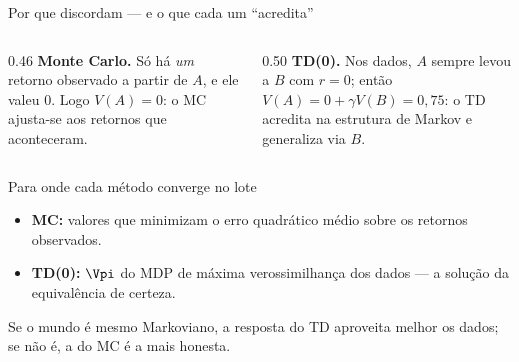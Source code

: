 \documentclass[aspectratio=169, 11pt]{beamer}
\begin{document}
\begin{frame}{Por que discordam — e o que cada um ``acredita''}
  \begin{columns}[T]
    \begin{column}{0.46\textwidth}
      \small\textbf{Monte Carlo.} Só há \emph{um} retorno observado a
      partir de $A$, e ele valeu $0$. Logo $V(A) = 0$: o MC ajusta-se
      aos \alert{retornos que aconteceram}.
    \end{column}
    \begin{column}{0.50\textwidth}
      \small\textbf{TD(0).} Nos dados, $A$ sempre levou a $B$ com $r=0$;
      então $V(A) = 0 + \gamma V(B) = 0{,}75$: o TD \alert{acredita na
      estrutura de Markov} e generaliza via $B$.
    \end{column}
  \end{columns}

  \smallskip
  \begin{teobox}[fontupper=\small]{Para onde cada método converge no lote}
    \vspace{-0.2em}
    \begin{itemize}\setlength{\itemsep}{0.1ex}
      \item \textbf{MC:} valores que minimizam o erro quadrático médio
        sobre os retornos observados.
      \item \textbf{TD(0):} $\Vpi$ do MDP de máxima verossimilhança dos
        dados — a solução da \alert{equivalência de certeza}.
    \end{itemize}
  \end{teobox}

  \begin{ideiabox}
    Se o mundo é mesmo Markoviano, a resposta do TD aproveita melhor os
    dados; se não é, a do MC é a mais honesta.
  \end{ideiabox}
\end{frame}
\end{document}
